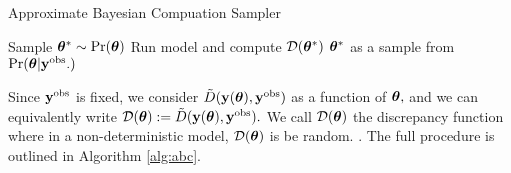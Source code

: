 \begin{algorithm}[htbp]
    \caption{Approximate Bayesian Compuation Sampler}
    \label{alg:abc}
    \begin{algorithmic}
        \State Sample $\bm{\theta}^\ast \sim \Pr(\bm{\theta})$
        \State Run model and compute $\mathcal{D}(\bm{\theta}^\ast)$
        \State \Return $\bm{\theta}^\ast$ as a sample from $\Pr(\bm{\theta}|\mathbf{y}^{\mathrm{obs}}.)$
        \EndIf
    \end{algorithmic}
\end{algorithm}

Since $\mathbf{y}^{\mathrm{obs}}$ is fixed, we consider $\tilde{D}(\mathbf{y}(\bm{\theta}), \mathbf{y}^{\mathrm{obs}})$ as a
function of $\bm{\theta},$ and
we can equivalently write $\mathcal{D}(\bm{\theta}) := \tilde{D}(\mathbf{y}(\bm{\theta}), \mathbf{y}^{\mathrm{obs}}).$
We call $\mathcal{D}(\bm{\theta})$ the discrepancy function where in a
non-deterministic model, $\mathcal{D}(\bm{\theta})$ is be random.
. The full procedure is outlined in Algorithm \ref{alg:abc}.